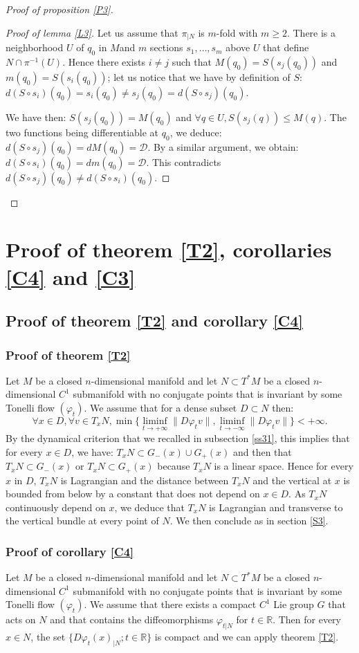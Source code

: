 \documentclass{dcds}
\theoremstyle{definition}
\begin{document}
\begin{proof}[Proof of proposition \ref{P3}]
\begin{proof}[Proof of lemma \ref{L3}]
Let us assume that $\pi_{|N}$ is $m$-fold with $m\geq 2$. There is a neighborhood $U$ of $q_0$ in $M$and $m$ sections $s_1, \dots , s_m$ above $U$ that define $N\cap \pi^{-1}(U)$.  Hence there exists $i\not=j$ such that $M(q_0)=S(s_j(q_0))$ and $m(q_0)=S(s_i(q_0))$; let us notice that we have by definition of $S$: $d(S\circ s_i)(q_0)=s_i(q_0)\not= s_j(q_0)=d(S\circ s_j)(q_0)$.

We have then: $S(s_j(q_0))=M(q_0)$ and $\forall q\in U, S(s_j(q))\leq M(q)$. The two functions being differentiable at $q_0$, we deduce: $d(S\circ s_j)(q_0)=dM(q_0)={\mathcal {D}}$. By a similar argument, we obtain: $d(S\circ s_i)(q_0)=dm(q_0)={\mathcal {D}}$. This contradicts $d(S\circ s_j)(q_0)\not= d(S\circ s_i)(q_0)$.
\end{proof}\end{proof}
\section{Proof of theorem \ref{T2}, corollaries \ref{C4} and   \ref{C3}}
\subsection{Proof of theorem \ref{T2} and corollary \ref{C4}}
\subsubsection{Proof of theorem \ref{T2}}
 Let $M$ be a closed $n$-dimensional manifold and let $N\subset T^*M$ be a closed $n$-dimensional $C^1$ submanifold with no conjugate points  that is invariant by some Tonelli flow $(\varphi_t)$. We assume that for a dense subset $D\subset N$ then:
 $$\forall x\in D, \forall v\in T_xN, \min\{ \liminf_{t\rightarrow +\infty}\| D\varphi_tv\|, \liminf_{t\rightarrow -\infty} \| D\varphi_tv\|\}<+\infty.$$
 By the dynamical criterion that we recalled in subsection \ref{ss31}, this implies that for every $x\in D$, we have: $T_xN\subset G_-(x)\cup G_+(x)$ and then that $T_xN\subset G_-(x)$ or $T_xN\subset G_+(x)$ because $T_xN$ is a linear space. Hence for every $x$ in $D$, $T_xN$ is Lagrangian and  the distance between $T_xN$ and the vertical at $x$ is bounded from below by a constant  that does not depend on $x\in D$. As $T_xN$ continuously depend on $x$, we deduce that $T_xN$ is Lagrangian and transverse to the vertical bundle at every point of $N$. We then conclude as in section \ref{S3}.
   \subsubsection{Proof of corollary \ref{C4}}
    Let $M$ be a closed $n$-dimensional manifold and let $N\subset T^*M$ be a closed $n$-dimensional $C^1$ submanifold with no conjugate points  that is invariant by some Tonelli flow $(\varphi_t)$. We assume that there exists a compact $C^1$ Lie group $G$ that acts on $N$ and that contains the diffeomorphisms  $ \varphi_{t|N} $ for $t\in{\mathbb {R}}$.  Then for every $x\in N$, the set $\{ D\varphi_t(x)_{|N}; t\in{\mathbb {R}}\}$ is compact and we can apply theorem \ref{T2}.
\end{document}

